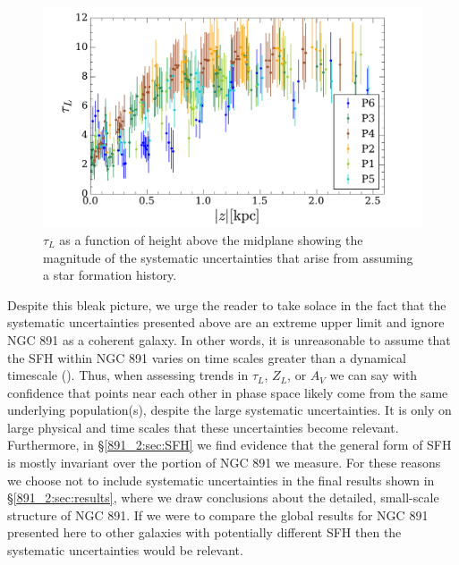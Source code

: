 

\begin{figure}
  \centering
  \includegraphics[width=\columnwidth]{891_2/figs/MLWA_sys_err.pdf}
  \caption[Systematic $\tau_L$ uncertainties in relation to our data]
          {\fixspacing\label{891_2:fig:MLWA_sys_err}$\tau_L$ as a
            function of height above the midplane showing the
            magnitude of the systematic uncertainties that arise from
            assuming a star formation history.}
\end{figure}

Despite this bleak picture, we urge the reader to take solace in the
fact that the systematic uncertainties presented above are an extreme
upper limit and ignore NGC 891 as a coherent galaxy. In other words,
it is unreasonable to assume that the SFH within NGC 891 varies on
time scales greater than a dynamical timescale (). Thus, when assessing trends in $\tau_L$, $Z_L$, or $A_V$ we
can say with confidence that points near each other in phase space
likely come from the same underlying population(s), despite the large
systematic uncertainties. It is only on large physical and time scales
that these uncertainties become relevant. Furthermore, in
\S\ref{891_2:sec:SFH} we find evidence that the general form of SFH is
mostly invariant over the portion of NGC 891 we measure. For these
reasons we choose not to include systematic uncertainties in the final
results shown in \S\ref{891_2:sec:results}, where we draw conclusions about
the detailed, small-scale structure of NGC 891. If we were to compare
the global results for NGC 891 presented here to other galaxies with
potentially different SFH then the systematic uncertainties would be
relevant.


